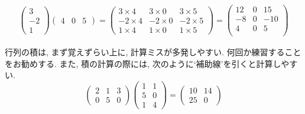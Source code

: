 \documentclass[a4j,dvipdfmx]{jsarticle}
\numberwithin{equation}{section}
\begin{document}
\begin{align*}
\begin{pmatrix}
                    3 \\ -2 \\ 1
                \end{pmatrix}
                \begin{pmatrix}
                    4 & 0 & 5
                \end{pmatrix}
                =\begin{pmatrix}
                    3 \times 4 & 3\times 0 & 3\times 5\\
                    -2\times 4 & -2 \times 0 & -2 \times 5\\
                    1 \times 4 & 1 \times 0 & 1 \times 5
                \end{pmatrix}
                =\begin{pmatrix}
                    12 & 0 & 15 \\
                    -8 & 0 & -10\\
                    4  & 0 & 5  \\ 
                \end{pmatrix}
            \end{align*}

            行列の積は, まず覚えずらい上に, 計算ミスが多発しやすい. 何回か練習することをお勧めする. また, 積の計算の際には, 次のように`補助線'を引くと計算しやすい.
            \begin{equation*}
                \left(
                \begin{array}{ccc} 
                    2 & 1 & 3 \\ \hline
                    0 & 5 & 0 
                \end{array} 
                \right)
                \left(
                \begin{array}{c|c} 
                1 & 1\\
                5 & 0\\
                1 & 4 
                \end{array} 
                \right)
                =\begin{pmatrix}
                    10 & 14\\
                    25 & 0
                \end{pmatrix}
            \end{equation*}
\end{document}

